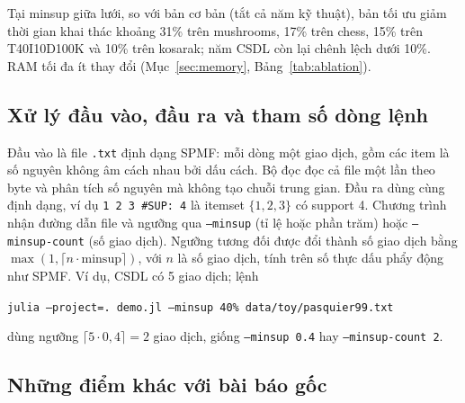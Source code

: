 Tại minsup giữa lưới, so với bản cơ bản (tắt cả năm kỹ thuật), bản tối ưu giảm thời gian khai thác
khoảng 31\% trên mushrooms, 17\% trên chess, 15\% trên T40I10D100K và 10\% trên kosarak; năm CSDL còn
lại chênh lệch dưới 10\%. RAM tối đa ít thay đổi (Mục~\ref{sec:memory}, Bảng~\ref{tab:ablation}).

\subsection{Xử lý đầu vào, đầu ra và tham số dòng lệnh}
\label{sec:io}

Đầu vào là file \texttt{.txt} định dạng SPMF: mỗi dòng một giao dịch, gồm các item là số nguyên không âm
cách nhau bởi dấu cách. Bộ đọc đọc cả file một lần theo byte và phân tích số nguyên mà không tạo chuỗi
trung gian. Đầu ra dùng cùng định dạng, ví dụ \texttt{1 2 3 \#SUP: 4} là itemset $\{1,2,3\}$ có support 4.
Chương trình  nhận đường dẫn file và ngưỡng qua \texttt{--minsup} (tỉ lệ hoặc phần trăm)
hoặc \texttt{--minsup-count} (số giao dịch). Ngưỡng tương đối được đổi thành số giao dịch bằng
$\max(1, \lceil n \cdot \mathrm{minsup} \rceil)$, với $n$ là số giao dịch, tính trên số thực dấu phẩy
động như SPMF. Ví dụ, CSDL  có 5 giao dịch; lệnh
\begin{center}
\small\texttt{julia --project=. demo.jl --minsup 40\% data/toy/pasquier99.txt}
\end{center}
dùng ngưỡng $\lceil 5 \cdot 0{,}4 \rceil = 2$ giao dịch, giống \texttt{--minsup 0.4} hay \texttt{--minsup-count 2}.

\subsection{Những điểm khác với bài báo gốc}
\label{sec:deviations}

